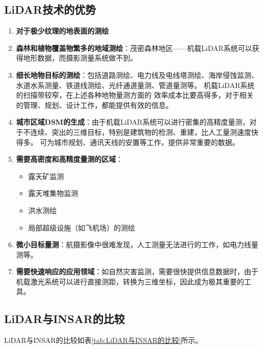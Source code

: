 \subsection{LiDAR技术的优势}
\begin{enumerate}
	\item \textbf{对于极少纹理的地表面的测绘}
	\item \textbf{森林和植物覆盖物繁多的地域测绘}：茂密森林地区——机载LiDAR系统可以获得地形数据，而摄影测量系统做不到。
	\item \textbf{细长地物目标的测绘}：包括道路测绘、电力线及电线塔测绘、海岸侵蚀监测、水道水系测量、铁道线测绘、光纤通道量测、管道量测等。
		机载LiDAR系统的扫描带较窄，在上述各种地物量测方面的 效率成本比要高得多，对于相关的管理、规划、设计工作，都能提供有效的信息。
	\item \textbf{城市区域DSM的生成}：由于机载LiDAR系统可以进行密集的高精度量测，对于不连续、突出的三维目标，特别是建筑物的检测、重建，比人工量测速度快得多。
		可为城市规划、通讯天线的安置等工作，提供非常重要的数据。
	\item \textbf{需要高密度和高精度量测的区域}：\begin{itemize}
			\item 露天矿监测
			\item 露天堆集物监测
			\item 洪水测绘
			\item 局部超级设施（如飞机场）的测绘
		\end{itemize}
	\item \textbf{微小目标量测}：航摄影像中很难发现，人工测量无法进行的工作，如电力线量测等。
	\item \textbf{需要快速响应的应用领域}：如自然灾害监测，需要很快提供信息数据时，由于机载激光系统可以进行直接测距，转换为三维坐标，因此成为极其重要的工具。
\end{enumerate}

\subsection{LiDAR与INSAR的比较}
LiDAR与INSAR的比较如表\ref{tab:LiDAR与INSAR的比较}所示。

